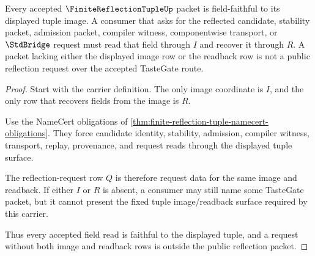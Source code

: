 \begin{theorem}
\label{thm:finite-reflection-tuple-fieldfaithful-prediction}
Every accepted $\FiniteReflectionTupleUp$ packet is field-faithful to its displayed tuple image. A consumer that asks for the reflected candidate, stability packet, admission packet, compiler witness, componentwise transport, or $\StdBridge$ request must read that field through $I$ and recover it through $R$. A packet lacking either the displayed image row or the readback row is not a public reflection request over the accepted TasteGate route.
\end{theorem}
\begin{proof}
Start with the carrier definition. The only image coordinate is $I$, and the only row that recovers fields from the image is $R$.

Use the NameCert obligations of \autoref{thm:finite-reflection-tuple-namecert-obligations}. They force candidate identity, stability, admission, compiler witness, transport, replay, provenance, and request reads through the displayed tuple surface.

The reflection-request row $Q$ is therefore request data for the same image and readback. If either $I$ or $R$ is absent, a consumer may still name some TasteGate packet, but it cannot present the fixed tuple image/readback surface required by this carrier.

Thus every accepted field read is faithful to the displayed tuple, and a request without both image and readback rows is outside the public reflection packet.
\end{proof}

